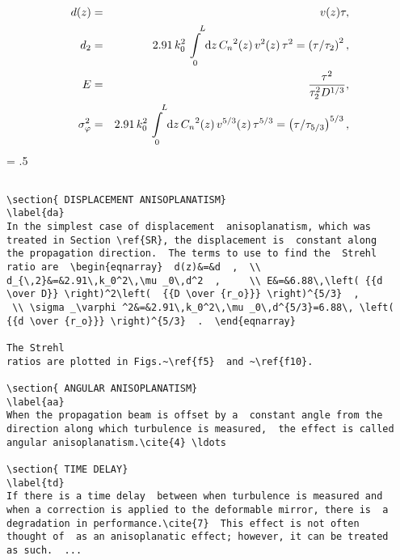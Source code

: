 \begin{eqnarray}   d(z)&=&v(z)\tau   ,  \\
d_2&=&2.91\,k_0^2\int\limits_{\,\,\, 0}^{\,\,\,\,\,\, L} {\rm
d}z\,{C_n}^2(z)\,v^2(z)\,\tau ^2=\left(  {\tau / \tau _2} \right)^2
,   \\    E&=&{{\tau ^2} \over {\tau _2^2D^{1/ 3}}}  ,  \\  \sigma
_\varphi ^2&=&2.91\,k_0^2\int\limits_{\,\,\, 0}^{\,\,\,\,\,\, L}  {\rm
d}z\,{C_n}^2(z)\,v^{5/ 3}(z)\,\tau ^{5/ 3}=\left( {\tau / \tau _{5/
3}} \right)^{5/ 3}  ,   \end{eqnarray}
\newpage
\baselineskip = .5\baselineskip  %
\begin{verbatim}

\section{ DISPLACEMENT ANISOPLANATISM}
\label{da}
In the simplest case of displacement  anisoplanatism, which was
treated in Section \ref{SR}, the displacement is  constant along
the propagation direction.  The terms to use to find the  Strehl
ratio are  \begin{eqnarray}  d(z)&=&d  ,  \\
d_{\,2}&=&2.91\,k_0^2\,\mu _0\,d^2  ,     \\ E&=&6.88\,\left( {{d
\over D}} \right)^2\left(  {{D \over {r_o}}} \right)^{5/3}  ,
 \\ \sigma _\varphi ^2&=&2.91\,k_0^2\,\mu _0\,d^{5/3}=6.88\, \left(
{{d \over {r_o}}} \right)^{5/3}  .  \end{eqnarray}

The Strehl
ratios are plotted in Figs.~\ref{f5}  and ~\ref{f10}.

\section{ ANGULAR ANISOPLANATISM}
\label{aa}
When the propagation beam is offset by a  constant angle from the
direction along which turbulence is measured,  the effect is called
angular anisoplanatism.\cite{4} \ldots

\section{ TIME DELAY}
\label{td}
If there is a time delay  between when turbulence is measured and
when a correction is applied to the deformable mirror, there is  a
degradation in performance.\cite{7}  This effect is not often
thought of  as an anisoplanatic effect; however, it can be treated
as such.  ...


\end{verbatim}
